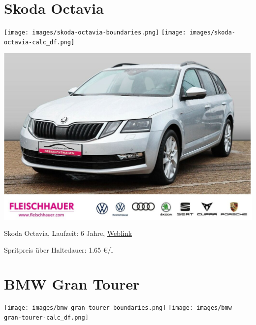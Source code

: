 \documentclass[landscape, DIV=99, 14pt]{scrartcl}
\begin{document}
\pagebreak


\twocolumn

\section*{Skoda Octavia}
\begin{center}
\texttt{[image: images/skoda-octavia-boundaries.png]}
\null
\vspace{0.5cm}
\texttt{[image: images/skoda-octavia-calc\_df.png]}
\end{center}

\pagebreak
\null
\vspace{2cm}
\begin{center}
\includegraphics[width=0.9\columnwidth]{cars/skoda-octavia.png}

Skoda Octavia, Laufzeit: 6 Jahre, \href{https://suchen.mobile.de/fahrzeuge/details.html?id=333524150}{Weblink}

Spritpreis \"uber Haltedauer: 1.65 \euro{}/l

\end{center}

\pagebreak


\twocolumn

\section*{BMW Gran Tourer}
\begin{center}
\texttt{[image: images/bmw-gran-tourer-boundaries.png]}
\null
\vspace{0.5cm}
\texttt{[image: images/bmw-gran-tourer-calc\_df.png]}
\end{center}
\end{document}
